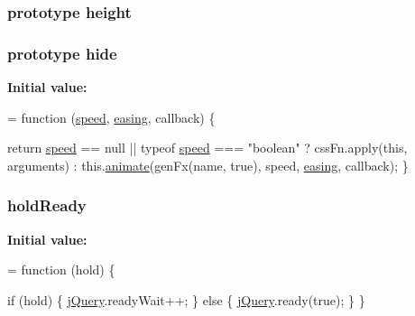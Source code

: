 \subsubsection[{\texorpdfstring{height}{height}}]{ {\bf prototype} height}\hypertarget{jquery-2_82_81-vsdoc_8js_ac05c0989a60ed0912fa475cb09c11162}{}\label{jquery-2_82_81-vsdoc_8js_ac05c0989a60ed0912fa475cb09c11162}
\subsubsection[{\texorpdfstring{hide}{hide}}]{ {\bf prototype} hide}\hypertarget{jquery-2_82_81-vsdoc_8js_ab184a969b4c8542290dae744d90fd4d2}{}\label{jquery-2_82_81-vsdoc_8js_ab184a969b4c8542290dae744d90fd4d2}
{\bfseries Initial value\+:}
\begin{DoxyCode}
= \textcolor{keyword}{function} (\hyperlink{jquery-2_82_81-vsdoc_8js_add98c90065e6563cba26ff6d2016c46c}{speed}, \hyperlink{jquery-2_82_81-vsdoc_8js_a9758a312629fa6de1744280dd6e6253b}{easing}, callback) \{
        

        \textcolor{keywordflow}{return} \hyperlink{jquery-2_82_81-vsdoc_8js_add98c90065e6563cba26ff6d2016c46c}{speed} == null || typeof \hyperlink{jquery-2_82_81-vsdoc_8js_add98c90065e6563cba26ff6d2016c46c}{speed} === \textcolor{stringliteral}{"boolean"} ?
            cssFn.apply(\textcolor{keyword}{this}, arguments) :
            this.\hyperlink{jquery-2_82_81-vsdoc_8js_a956a1d08128d41115c45b6815814a64d}{animate}(genFx(name, \textcolor{keyword}{true}), speed, \hyperlink{jquery-2_82_81-vsdoc_8js_a9758a312629fa6de1744280dd6e6253b}{easing}, callback);
    \}
\end{DoxyCode}
\subsubsection[{\texorpdfstring{hold\+Ready}{holdReady}}]{ hold\+Ready}\hypertarget{jquery-2_82_81-vsdoc_8js_a551f58116e29e1744dd3bea8e611eb9f}{}\label{jquery-2_82_81-vsdoc_8js_a551f58116e29e1744dd3bea8e611eb9f}
{\bfseries Initial value\+:}
\begin{DoxyCode}
= \textcolor{keyword}{function} (hold) \{
        

        \textcolor{keywordflow}{if} (hold) \{
            \hyperlink{jquery-2_82_81-vsdoc_8js_add5237586d970a38a81f990e8eb28c6c}{jQuery}.readyWait++;
        \} \textcolor{keywordflow}{else} \{
            \hyperlink{jquery-2_82_81-vsdoc_8js_add5237586d970a38a81f990e8eb28c6c}{jQuery}.ready(\textcolor{keyword}{true});
        \}
    \}
\end{DoxyCode}
